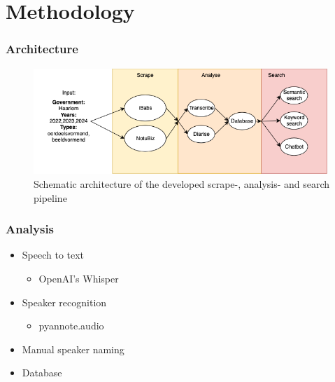 \documentclass[aspectratio=169,sidebar]{uva-inf-presentation}
\begin{document}
\section{Methodology}
\begin{frame}\frametitle{Architecture}
\begin{figure}
    \centering
    \includegraphics[width=0.99\textwidth]{images/arch.png}
    \caption{Schematic architecture of the developed scrape-, analysis- and search pipeline}
    \label{fig:pipeline}
\end{figure}
\end{frame}



\begin{frame}\frametitle{Analysis}
\begin{itemize}
    \item Speech to text
    \begin{itemize}
        \item OpenAI's Whisper
    \end{itemize}
    \item Speaker recognition
    \begin{itemize}
        \item pyannote.audio
    \end{itemize}
    \item Manual speaker naming
    \item Database
\end{itemize}
\end{frame}
\end{document}

